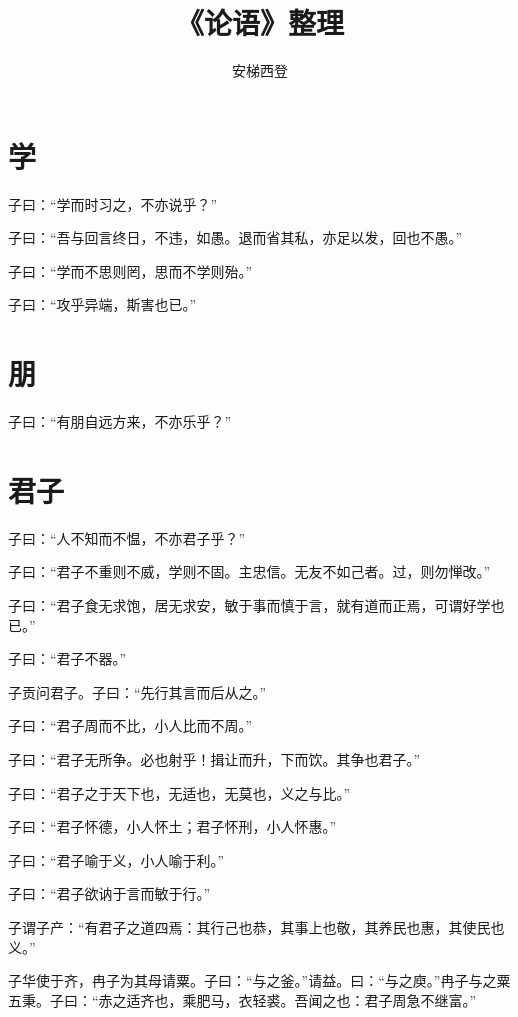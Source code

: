 \documentclass[a5paper]{ctexbook}
\title{《论语》整理}
\author{安梯西登}
\date{}
\begin{document}
    \maketitle

    \tableofcontents

    \chapter{学}

    子曰：“学而时习之，不亦说乎？”

    子曰：“吾与回言终日，不违，如愚。退而省其私，亦足以发，回也不愚。”

    子曰：“学而不思则罔，思而不学则殆。”

    子曰：“攻乎异端，斯害也已。”

    \chapter{朋}
    
    子曰：“有朋自远方来，不亦乐乎？”

    \chapter{君子}
    
    子曰：“人不知而不愠，不亦君子乎？”

    子曰：“君子不重则不威，学则不固。主忠信。无友不如己者。过，则勿惮改。”

    子曰：“君子食无求饱，居无求安，敏于事而慎于言，就有道而正焉，可谓好学也已。”

    子曰：“君子不器。”
    
    子贡问君子。子曰：“先行其言而后从之。”
    
    子曰：“君子周而不比，小人比而不周。”

    子曰：“君子无所争。必也射乎！揖让而升，下而饮。其争也君子。”

    子曰：“君子之于天下也，无适也，无莫也，义之与比。”

    子曰：“君子怀德，小人怀土；君子怀刑，小人怀惠。”

    子曰：“君子喻于义，小人喻于利。”

    子曰：“君子欲讷于言而敏于行。”

    子谓子产：“有君子之道四焉：其行己也恭，其事上也敬，其养民也惠，其使民也义。”

    子华使于齐，冉子为其母请粟。子曰：“与之釜。”请益。曰：“与之庾。”冉子与之粟五秉。子曰：“赤之适齐也，乘肥马，衣轻裘。吾闻之也：君子周急不继富。”
\end{document}
